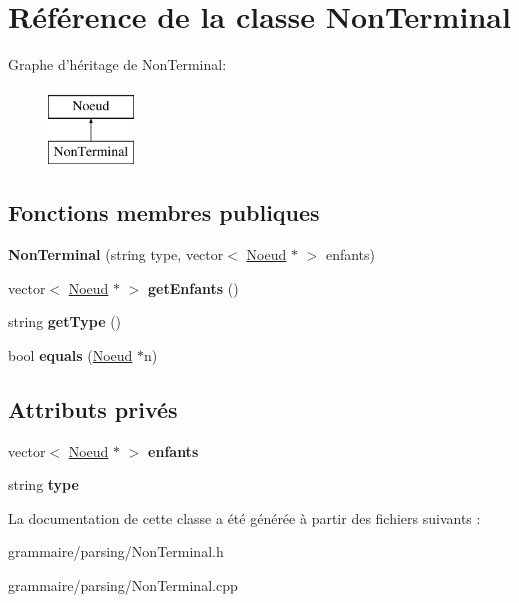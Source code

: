 \hypertarget{class_non_terminal}{\section{Référence de la classe Non\-Terminal}
\label{class_non_terminal}
}
Graphe d'héritage de Non\-Terminal\-:\begin{figure}[H]
\begin{center}
\leavevmode
\includegraphics[height=2.000000cm]{class_non_terminal}
\end{center}
\end{figure}
\subsection*{Fonctions membres publiques}
\begin{DoxyCompactItemize}
\item 
\hypertarget{class_non_terminal_a71519a9ddb6a0ca896360a09cc2c612e}{{\bfseries Non\-Terminal} (string type, vector$<$ \hyperlink{class_noeud}{Noeud} $\ast$ $>$ enfants)}\label{class_non_terminal_a71519a9ddb6a0ca896360a09cc2c612e}

\item 
\hypertarget{class_non_terminal_ac1a9b3b1dcd715b6889d615354d4ae1b}{vector$<$ \hyperlink{class_noeud}{Noeud} $\ast$ $>$ {\bfseries get\-Enfants} ()}\label{class_non_terminal_ac1a9b3b1dcd715b6889d615354d4ae1b}

\item 
\hypertarget{class_non_terminal_abb05a6a5e8850c55deb08a33d665a588}{string {\bfseries get\-Type} ()}\label{class_non_terminal_abb05a6a5e8850c55deb08a33d665a588}

\item 
\hypertarget{class_non_terminal_ad1871090f16d09962e99fc02f5f28e1f}{bool {\bfseries equals} (\hyperlink{class_noeud}{Noeud} $\ast$n)}\label{class_non_terminal_ad1871090f16d09962e99fc02f5f28e1f}

\end{DoxyCompactItemize}
\subsection*{Attributs privés}
\begin{DoxyCompactItemize}
\item 
\hypertarget{class_non_terminal_a74245dee79b2ef98bcd75c10c25e79c0}{vector$<$ \hyperlink{class_noeud}{Noeud} $\ast$ $>$ {\bfseries enfants}}\label{class_non_terminal_a74245dee79b2ef98bcd75c10c25e79c0}

\item 
\hypertarget{class_non_terminal_a3a7aed08c66e46f67ef0a1f532a3b83c}{string {\bfseries type}}\label{class_non_terminal_a3a7aed08c66e46f67ef0a1f532a3b83c}

\end{DoxyCompactItemize}


La documentation de cette classe a été générée à partir des fichiers suivants \-:\begin{DoxyCompactItemize}
\item 
grammaire/parsing/Non\-Terminal.\-h\item 
grammaire/parsing/Non\-Terminal.\-cpp\end{DoxyCompactItemize}

